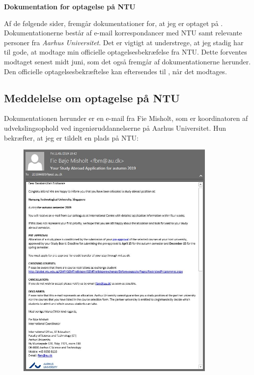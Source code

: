 \documentclass[../Ansoegning.tex]{subfiles}
\begin{document}
\begin{center}
    \textbf{\LARGE{Dokumentation for optagelse på NTU}}\vspace{-3ex}
\end{center}

Af de følgende sider, fremgår dokumentationer for, at jeg er optaget på \textit{\NTU}. Dokumentationerne består af e-mail korrespondancer med NTU samt relevante personer fra \textit{Aarhus Universitet}. Det er vigtigt at understrege, at jeg stadig har til gode, at modtage min officielle optagelsesbekræfelse fra NTU. Dette forventes modtaget senest midt juni, som det også fremgår af dokumentationerne herunder. Den officielle optagelsesbekræftelse kan eftersendes til \FondNavn, når det modtages.

\subsection*{Meddelelse om optagelse på NTU}
Dokumentationen herunder er en e-mail fra Fie Misholt, som er koordinatoren af udvekslingsophold ved ingeniøruddannelserne på Aarhus Universitet. Hun bekræfter, at jeg er tildelt en plads på NTU: 
\begin{figure}[H]
	\centering
	\includegraphics[width=0.87\textwidth]{Eksterne_filer/dokumentation1.JPG}
\end{figure}
\end{document}
